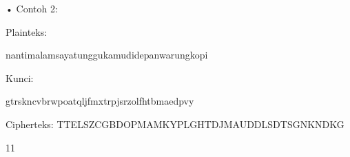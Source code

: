 \documentclass{article}
\begin{document}

• Contoh 2: 

  Plainteks: 

 nantimalamsayatunggukamudidepanwarungkopi

     Kunci: 

gtrskncvbrwpoatqljfmxtrpjsrzolfhtbmaedpvy

    Cipherteks: TTELSZCGBDOPMAMKYPLGHTDJMAUDDLSDTSGNKNDKG

11
\end{document}

